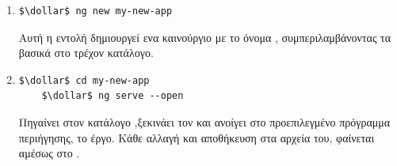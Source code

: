 \begin{enumerate}[label=\textbf{\arabic*}]
   \item 
	\begin{lstlisting}[language=command.com]
	$\dollar$ ng new my-new-app
	\end{lstlisting}
    
    Αυτή η εντολή δημιουργεί ενα καινούργιο  με το όνομα , συμπεριλαμβάνοντας τα βασικά   στο τρέχον κατάλογο.
  \item 
   \begin{lstlisting}[language=command.com]
    $\dollar$ cd my-new-app
    $\dollar$ ng serve --open
    \end{lstlisting}
    Πηγαίνει στον κατάλογο  ,ξεκινάει τον  και ανοίγει στο προεπιλεγμένο πρόγραμμα περιήγησης, το έργο. Κάθε αλλαγή και αποθήκευση στα αρχεία του, φαίνεται αμέσως στο .
\end{enumerate}

